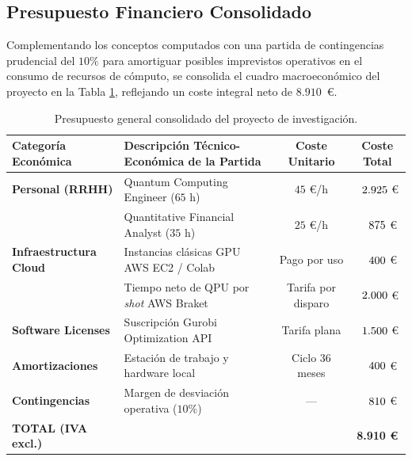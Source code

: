 \subsection{Presupuesto Financiero Consolidado}
Complementando los conceptos computados con una partida de contingencias prudencial del $10\%$ para amortiguar posibles imprevistos operativos en el consumo de recursos de cómputo, se consolida el cuadro macroeconómico del proyecto en la Tabla \ref{tab:presupuesto_total}, reflejando un coste integral neto de $8.910$~\euro{}.

\begin{table}[htbp]
    \centering
    \caption{Presupuesto general consolidado del proyecto de investigación.}
    \label{tab:presupuesto_total}
    \begin{tabular}{lp{6.2cm}cc}
        \toprule
        \textbf{Categoría Económica} & \textbf{Descripción Técnico-Económica de la Partida} & \textbf{Coste Unitario} & \textbf{Coste Total} \\
        \midrule
        \textbf{Personal (RRHH)} & Quantum Computing Engineer ($65$ h) & $45$ \euro{}/h & $\hphantom{0}2.925$ \euro{} \\
        & Quantitative Financial Analyst ($35$ h) & $25$ \euro{}/h & $\hphantom{00}875$ \euro{} \\
        \addlinespace
        \textbf{Infraestructura Cloud} & Instancias clásicas GPU AWS EC2 / Colab & Pago por uso & $\hphantom{00}400$ \euro{} \\
        & Tiempo neto de QPU por \textit{shot} AWS Braket & Tarifa por disparo & $\hphantom{0}2.000$ \euro{} \\
        \addlinespace
        \textbf{Software Licenses} & Suscripción Gurobi Optimization API & Tarifa plana & $\hphantom{0}1.500$ \euro{} \\
        \addlinespace
        \textbf{Amortizaciones} & Estación de trabajo y hardware local & Ciclo 36 meses & $\hphantom{00}400$ \euro{} \\
        \addlinespace
        \textbf{Contingencias} & Margen de desviación operativa ($10\%$) & — & $\hphantom{00}810$ \euro{} \\
        \midrule
        \textbf{TOTAL (IVA excl.)} & & & \textbf{\hphantom{0}8.910 \euro{}} \\
        \bottomrule
    \end{tabular}
\end{table}